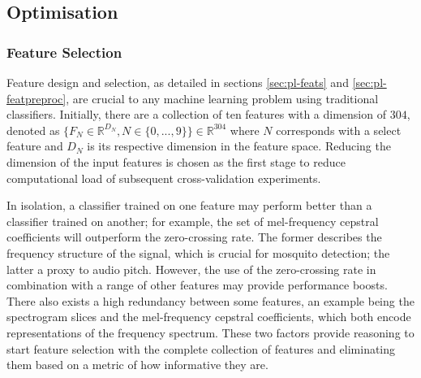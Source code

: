     \subsection{Optimisation}
    \label{subsec:exp-clf-opt}
    
        \subsubsection{Feature Selection}
        \label{subsubsec:exp-clf-opt-featsel}
            Feature design and selection, as detailed in sections \ref{sec:pl-feats} and \ref{sec:pl-featpreproc}, are crucial to any machine learning problem using traditional classifiers. Initially, there are a collection of ten features with a dimension of $304$, denoted as $\{F_{N}\in\mathbb{R}^{D_{N}},N\in\{0,...,9\}\}\in\mathbb{R}^{304}$ where $N$ corresponds with a select feature and $D_N$ is its respective dimension in the feature space. Reducing the dimension of the input features is chosen as the first stage to reduce computational load of subsequent cross-validation experiments.
            
            In isolation, a classifier trained on one feature may perform better than a classifier trained on another; for example, the set of mel-frequency cepstral coefficients will outperform the zero-crossing rate. The former describes the frequency structure of the signal, which is crucial for mosquito detection; the latter a proxy to audio pitch. However, the use of the zero-crossing rate in combination with a range of other features may provide performance boosts. There also exists a high redundancy between some features, an example being the spectrogram slices and the mel-frequency cepstral coefficients, which both encode representations of the frequency spectrum. These two factors provide reasoning to start feature selection with the complete collection of features and eliminating them based on a metric of how informative they are. 
            
